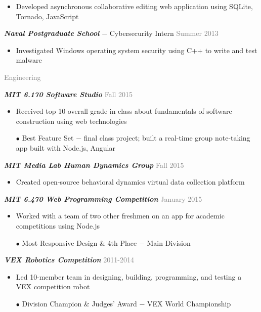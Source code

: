 \documentclass[11pt]{article}
\newcommand{\rsection}[1]{\vspace{1.5em}\textcolor{gray}{\Large \robotoslab #1}\vspace{0.5em}}
\newcommand{\bt}[1]{\textit{\textbf{#1}}} %
\newcommand{\gap}[0]{\vspace{0.5em}} %
\newcommand{\dash}[0]{ $-$ } %
\newcommand{\gray}[1]{\textcolor{gray}{#1}}
\begin{document}
\begin{itemize}
\item Developed asynchronous collaborative editing web application using SQLite, Tornado, JavaScript
\end{itemize}

\gap

\bt{Naval Postgraduate School}\dash Cybersecurity Intern \hfill \gray{Summer 2013}

\begin{itemize}
\item Investigated Windows operating system security using C++ to write and test malware
\end{itemize}

\rsection{Engineering}

\bt{MIT 6.170 Software Studio} \hfill \gray{Fall 2015}

\begin{itemize}
\item Received top 10 overall grade in class about fundamentals of software construction using web technologies
\item[$\bullet$] Best Feature Set\dash final class project; built a real-time group note-taking app built with Node.js, Angular
\end{itemize}

\gap

\bt{MIT Media Lab Human Dynamics Group} \hfill \gray{Fall 2015}

\begin{itemize}
\item Created open-source behavioral dynamics virtual data collection platform
\end{itemize}

\gap

\bt{MIT 6.470 Web Programming Competition} \hfill \gray{January 2015}

\begin{itemize}
\item Worked with a team of two other freshmen on an app for academic competitions using Node.js
\item[$\bullet$] Most Responsive Design \& 4th Place\dash Main Division
\end{itemize}

\gap

\bt{VEX Robotics Competition} \hfill \gray{2011-2014}

\begin{itemize}
\item Led 10-member team in designing, building, programming, and testing a VEX competition robot
\item[$\bullet$] Division Champion \& Judges' Award\dash VEX World Championship
\end{itemize}
\end{document}
